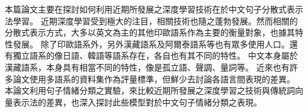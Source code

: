 \begin{abstractCH}

本篇論文主要在探討如何利用近期所發展之深度學習技術在於中文句子分散式表示法學習。 
近期深度學習受到極大的注目，相關技術也隨之蓬勃發展。然而相關的分散式表示方式，大多以英文為主的其他印歐語系作為主要的衡量對象，也據其特性發展。 
除了印歐語系外，另外漢藏語系及阿爾泰語系等也有眾多使用人口。還有獨立語系的像日語、韓語等語系存在，各自也有其不同的特性。
中文本身屬於漢藏語系，本身具有相當不同的特性，像是孤立語、聲調、量詞等。
近來也有許多論文使用多語系的資料集作為評量標準，但鮮少去討論各語言間表現的差異。\\

本論文利用句子情緒分類之實驗，來比較近期所發展之深度學習之技術與傳統詞向量表示法的差異，也深入探討此些模型對於中文句子情緒分類之表現。

\end{abstractCH}

